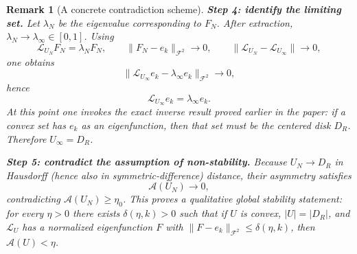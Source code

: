 \documentclass[a4paper,11pt,reqno]{amsart}
\newtheorem{remark}{Remark}[section]
\begin{document}
\begin{remark}[A concrete contradiction scheme]
\smallskip
\textbf{Step 4: identify the limiting set.}
Let $\lambda_N$ be the eigenvalue corresponding to $F_N$.
After extraction, $\lambda_N\to\lambda_\infty\in[0,1]$. Using
\[
\mathcal L_{U_N}F_N=\lambda_NF_N,
\qquad
\|F_N-e_k\|_{\mathcal F^2}\to 0,
\qquad
\|\mathcal L_{U_N}-\mathcal L_{U_\infty}\|\to 0,
\]
one obtains
\[
\|\mathcal L_{U_\infty}e_k-\lambda_\infty e_k\|_{\mathcal F^2}\to 0,
\]
hence
\[
\mathcal L_{U_\infty}e_k=\lambda_\infty e_k.
\]
At this point one invokes the exact inverse result proved earlier in the paper:
if a convex set has $e_k$ as an eigenfunction, then that set must be the centered
disk $D_R$. Therefore $U_\infty=D_R$.

\smallskip
\textbf{Step 5: contradict the assumption of non-stability.}
Because $U_N\to D_R$ in Hausdorff (hence also in symmetric-difference) distance,
their asymmetry satisfies
\[
\mathcal A(U_N)\to 0,
\]
contradicting $\mathcal A(U_N)\ge\eta_0$. This proves a \emph{qualitative global
stability statement}: for every $\eta>0$ there exists $\delta(\eta,k)>0$ such
that if $U$ is convex, $|U|=|D_R|$, and $\mathcal L_U$ has a normalized
eigenfunction $F$ with $\|F-e_k\|_{\mathcal F^2}\le\delta(\eta,k)$, then
$\mathcal A(U)<\eta$.
\end{remark}
\end{document}
